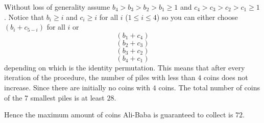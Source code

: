 \documentclass{article}
\begin{document}
\begin{enumerate}
Without loss of generality assume $b_4 > b_3 > b_2 > b_1 \ge 1$ and $c_4 > c_3 > c_2 > c_1 \ge 1$. Notice that $b_i \ge i$ and $c_i \ge i$ for all $i$ ($1 \le i \le 4$) so you can either choose $(b_i + c_{5-i} )$ for all $i$ or
$$(b_1 + c_4 )$$
$$(b_2 + c_3 )$$
$$(b_3 + c_2 )$$
$$(b_4 + c_1 )$$
depending on which is the identity permutation. This means that after every iteration of the procedure, the number of piles with less than $4$ coins does not increase. Since there are initially no coins with $4$ coins. The total number of coins of the $7$ smallest piles is at least $28$.

Hence the maximum amount of coins Ali-Baba is guaranteed to collect is $72$.
\end{enumerate}
\end{document}
